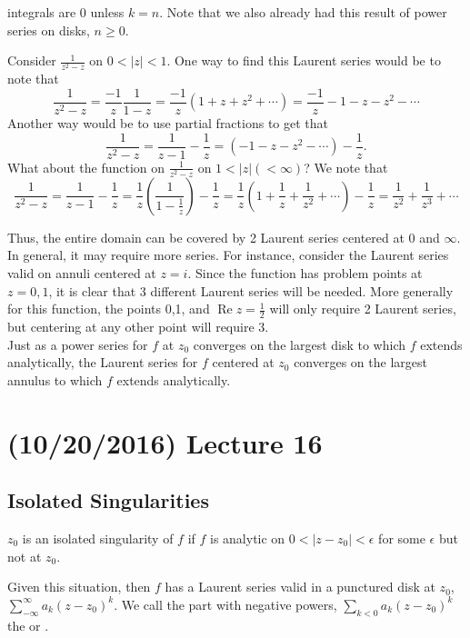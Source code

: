 \documentclass[11pt,leqno,oneside]{amsart}
\numberwithin{thm}{section}
\renewcommand{\Re}{\operatorname{Re}}
\begin{document}
  integrals are 0 unless $k=n$. Note that we also already had this
  result of power series on disks, $n \geq 0$.
  \begin{example}
    Consider $\frac{1}{z^2-z}$ on $0 < |z| < 1$. One way to find this
    Laurent series would be to note that \[
      \frac{1}{z^2-z} = \frac{-1}{z}\frac{1}{1-z} =
      \frac{-1}{z}(1+z+z^2+\cdots) = \frac{-1}{z}-1-z-z^2-\cdots
    \]
    Another way would be to use partial fractions to get that \[
      \frac{1}{z^2-z} = \frac{1}{z-1} - \frac{1}{z} =
      (-1-z-z^2-\cdots) - \frac{1}{z}.
    \]
    What about the function on $\frac{1}{z^2-z}$ on $1 < |z| (<
    \infty)$? We note that \[
      \frac{1}{z^2-z} = \frac{1}{z-1} - \frac{1}{z} =
      \frac{1}{z}\left(\frac{1}{1-\frac{1}{z}}\right) - \frac{1}{z} =
      \frac{1}{z}\left( 1 + \frac{1}{z} + \frac{1}{z^2} + \cdots \right) -
        \frac{1}{z} = \frac{1}{z^2} + \frac{1}{z^3} + \cdots
    \]
  \end{example}
  Thus, the entire domain can be covered by 2 Laurent series centered
  at 0 and $\infty$.  In general, it may require more series. For
  instance, consider the Laurent series valid on annuli centered at
  $z=i$. Since the function has problem points at $z=0,1$, it is clear
  that 3 different Laurent series will be needed. More generally for
  this function, the points 0,1, and $\Re z = \frac{1}{2}$ will only
  require 2 Laurent series, but centering at any other point will
  require 3. \\

  Just as a power series for $f$ at $z_0$ converges on the largest
  disk to which $f$ extends analytically, the Laurent series for $f$
  centered at $z_0$ converges on the largest annulus to which $f$
  extends analytically.

  \section{(10/20/2016) Lecture 16}
  \subsection*{Isolated Singularities}
  \begin{defn}
    $z_0$ is an isolated singularity of $f$ if $f$ is analytic on $0 <
    |z-z_0| < \epsilon$ for some $\epsilon$ but not at $z_0$.
  \end{defn}
  Given this situation, then $f$ has a Laurent series valid in a
  punctured disk at $z_0$, $\sum_{-\infty}^\infty a_k(z-z_0)^k$. We
  call the part with negative powers, $\sum_{k < 0} a_k(z-z_0)^k$ the
   or .
\end{document}
